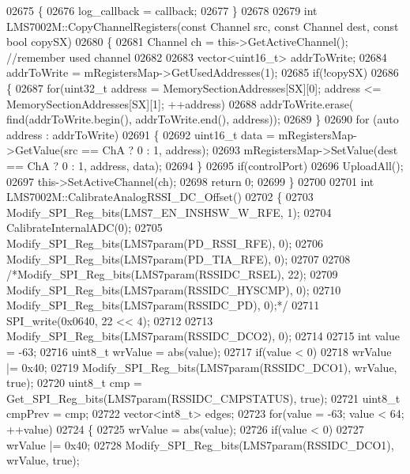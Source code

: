 \begin{DoxyCode}
{{{{{{{{{{{{{{{{{{{{{{{{{{{{{{{{{{{{{{{{{{{{{{{{{{{{{{{{{{{{{{{{{02675 \{
02676     log_callback = callback;
02677 \}
02678 
02679 \textcolor{keywordtype}{int} LMS7002M::CopyChannelRegisters(\textcolor{keyword}{const} Channel src, \textcolor{keyword}{const} Channel dest, \textcolor{keyword}{const} \textcolor{keywordtype}{bool} copySX)
02680 \{
02681     Channel ch = this->GetActiveChannel(); \textcolor{comment}{//remember used channel}
02682 
02683     vector<uint16\_t> addrToWrite;
02684     addrToWrite = mRegistersMap->GetUsedAddresses(1);
02685     \textcolor{keywordflow}{if}(!copySX)
02686     \{
02687         \textcolor{keywordflow}{for}(uint32\_t address = MemorySectionAddresses[SX][0]; address <= 
      MemorySectionAddresses[SX][1]; ++address)
02688             addrToWrite.erase( find(addrToWrite.begin(), addrToWrite.end(), 
      address));
02689     \}
02690     \textcolor{keywordflow}{for} (\textcolor{keyword}{auto} address : addrToWrite)
02691     \{
02692         uint16\_t data = mRegistersMap->GetValue(src == ChA ? 0 : 1, address);
02693         mRegistersMap->SetValue(dest == ChA ? 0 : 1, address, data);
02694     \}
02695     \textcolor{keywordflow}{if}(controlPort)
02696         UploadAll();
02697     this->SetActiveChannel(ch);
02698     \textcolor{keywordflow}{return} 0;
02699 \}
02700 
02701 \textcolor{keywordtype}{int} LMS7002M::CalibrateAnalogRSSI_DC_Offset()
02702 \{
02703     Modify_SPI_Reg_bits(LMS7_EN_INSHSW_W_RFE, 1);
02704     CalibrateInternalADC(0);
02705     Modify_SPI_Reg_bits(LMS7param(PD_RSSI_RFE), 0);
02706     Modify_SPI_Reg_bits(LMS7param(PD_TIA_RFE), 0);
02707 
02708     \textcolor{comment}{/*Modify\_SPI\_Reg\_bits(LMS7param(RSSIDC\_RSEL), 22);}
02709 \textcolor{comment}{    Modify\_SPI\_Reg\_bits(LMS7param(RSSIDC\_HYSCMP), 0);}
02710 \textcolor{comment}{    Modify\_SPI\_Reg\_bits(LMS7param(RSSIDC\_PD), 0);*/}
02711     SPI_write(0x0640, 22 << 4);
02712 
02713     Modify_SPI_Reg_bits(LMS7param(RSSIDC\_DCO2), 0);
02714 
02715     \textcolor{keywordtype}{int} value = -63;
02716     uint8\_t wrValue = abs(value);
02717     \textcolor{keywordflow}{if}(value < 0)
02718         wrValue |= 0x40;
02719     Modify_SPI_Reg_bits(LMS7param(RSSIDC\_DCO1), wrValue, \textcolor{keyword}{true});
02720     uint8\_t cmp = Get_SPI_Reg_bits(LMS7param(RSSIDC\_CMPSTATUS), \textcolor{keyword}{true});
02721     uint8\_t cmpPrev = cmp;
02722     vector<int8\_t> edges;
02723     \textcolor{keywordflow}{for}(value = -63; value < 64; ++value)
02724     \{
02725         wrValue = abs(value);
02726         \textcolor{keywordflow}{if}(value < 0)
02727             wrValue |= 0x40;
02728         Modify_SPI_Reg_bits(LMS7param(RSSIDC\_DCO1), wrValue, \textcolor{keyword}{true});
}}}}}}}}}}}}}}}}}}}}}}}}}}}}}}}}}}}}}}}}}}}}}}}}}}}}}}}}}}}}}}}}}
\end{DoxyCode}
